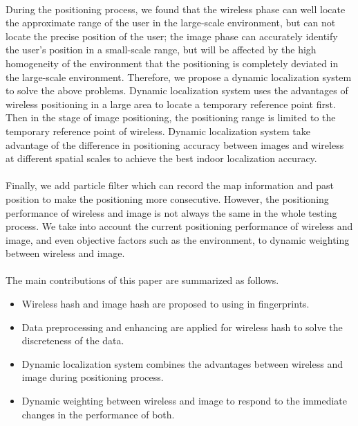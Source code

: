 \documentclass[a4paper,12pt]{report}
\begin{document}
\paragraph{}
During the positioning process, we found that the wireless phase can well locate the approximate range of the user in the large-scale environment, but can not locate the precise position of the user; the image phase can accurately identify the user's position in a small-scale range, but will be affected by the high homogeneity of the environment that the positioning is completely deviated in the large-scale environment. Therefore, we propose a dynamic localization system to solve the above problems. Dynamic localization system uses the advantages of wireless positioning in a large area to locate a temporary reference point first. Then in the stage of image positioning, the positioning range is limited to the temporary reference point of wireless. Dynamic localization system take advantage of the difference in positioning accuracy between images and wireless at different spatial scales to achieve the best indoor localization accuracy.
%

\paragraph{}
Finally, we add particle filter which can record the map information and past position to make the positioning more consecutive. However, the positioning performance of wireless and image is not always the same in the whole testing process. We take into account the current positioning performance of wireless and image, and even objective factors such as the environment, to dynamic weighting between wireless and image.
%

\paragraph{}
The main contributions of this paper are summarized as follows.
\begin{itemize}
\item  Wireless hash and image hash are proposed to using in fingerprints.
\item  Data preprocessing and enhancing are applied for wireless hash to solve the discreteness of the data.
\item  Dynamic localization system combines the advantages between wireless and image during positioning process.
\item  Dynamic weighting between wireless and image to respond to the immediate changes in the performance of both.
\end{itemize}
%
\end{document}
